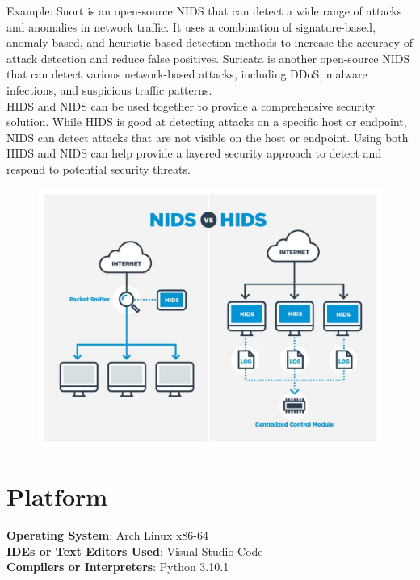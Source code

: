 \documentclass[11pt]{article}
\begin{document}
Example: Snort is an open-source NIDS that can detect a wide range of attacks and anomalies in network traffic. It uses a combination of signature-based, anomaly-based, and heuristic-based detection methods to increase the accuracy of attack detection and reduce false positives. Suricata is another open-source NIDS that can detect various network-based attacks, including DDoS, malware infections, and suspicious traffic patterns.\\

HIDS and NIDS can be used together to provide a comprehensive security solution. While HIDS is good at detecting attacks on a specific host or endpoint, NIDS can detect attacks that are not visible on the host or endpoint. Using both HIDS and NIDS can help provide a layered security approach to detect and respond to potential security threats.


\begin{figure}[H]
    \centering
    \includegraphics[width=.85\textwidth]{NIDS-vs-HIDS.jpg}
\end{figure}
\section{Platform}
\textbf{Operating System}: Arch Linux x86-64 \\
\textbf{IDEs or Text Editors Used}: Visual Studio Code\\
\textbf{Compilers or Interpreters}: Python 3.10.1\\
\end{document}
